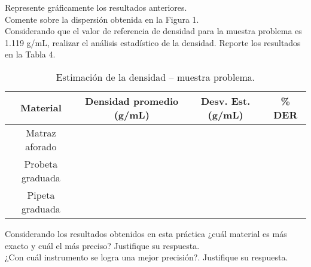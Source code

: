 \newpage

Represente gráficamente los resultados anteriores.\\[10pt]

Comente sobre la dispersión obtenida en la Figura 1.\\[10pt]

Considerando que el valor de referencia de densidad para la muestra problema es 1.119 g/mL, realizar el análisis estadístico de la densidad. Reporte los resultados en la Tabla 4.

\begin{table}[ht!]
\caption{Estimación de la densidad – muestra problema.}
    \centering
    \begin{tabular}{|c|c|c|c|}
    \hline
    \textbf{Material} & \textbf{Densidad promedio (g/mL)} & \textbf{Desv. Est. (g/mL)} & \textbf{\% DER}\\\hline
    Matraz aforado & & & \\\hline
    Probeta graduada & & & \\\hline
    Pipeta graduada & & & \\\hline
    \end{tabular}
\end{table}

Considerando los resultados obtenidos en esta práctica ¿cuál material es más exacto y cuál el más preciso? Justifique su respuesta.\\[10pt]

¿Con cuál instrumento se logra una mejor precisión?. Justifique su respuesta.